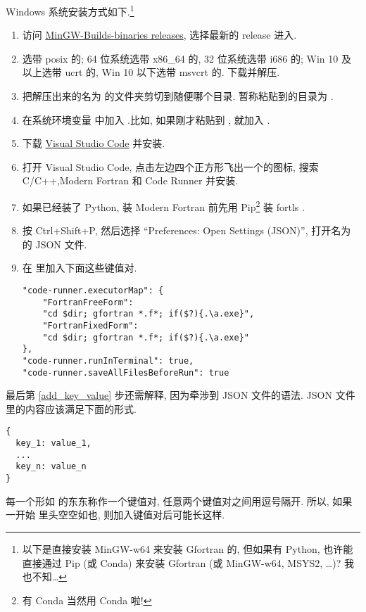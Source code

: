 Windows 系统安装方式如下.\footnote{
    以下是直接安装 MinGW-w64 来安装 Gfortran 的, 但如果有 Python, 也许能直接通过 Pip (或 Conda) 来安装 Gfortran (或 MinGW-w64, MSYS2, \dots{})? 我也不知\dots{}
}
\begin{enumerate}
    \item 访问 \href{https://github.com/niXman/mingw-builds-binaries/releases}
    {MinGW-Builds-binaries releases}, 选择最新的 release 进入.
    \item 选带 posix 的; 64 位系统选带 x86\_{}64 的, 32 位系统选带 i686 的; Win 10 及以上选带 ucrt 的, Win 10 以下选带 msvcrt 的. 下载并解压.
    \item 把解压出来的名为  的文件夹剪切到随便哪个目录. 暂称粘贴到的目录为 \ttt{[dir]}.
    \item 在系统环境变量  中加入 .比如, 如果刚才粘贴到 , 就加入 .
    \item 下载 \href{https://code.visualstudio.com/sha/download?build=stable&os=win32-x64-user}{Visual Studio Code} 并安装.
    \item 打开 Visual Studio Code, 点击左边四个正方形飞出一个的图标, 搜索 C/C++,Modern Fortran 和 Code Runner 并安装.
    \item[] 如果已经装了 Python, 装 Modern Fortran 前先用 Pip\footnote{有 Conda 当然用 Conda 啦!} 装 fortls .
    \item 按 Ctrl+Shift+P, 然后选择 ``Preferences: Open Settings (JSON)'', 打开名为  的 JSON 文件.
    \item 在  里加入下面这些键值对.\label{add_key_value}
    \begin{lstlisting}[numbers=none]
"code-runner.executorMap": {
    "FortranFreeForm":
    "cd $dir; gfortran *.f*; if($?){.\a.exe}",
    "FortranFixedForm":
    "cd $dir; gfortran *.f*; if($?){.\a.exe}"
},
"code-runner.runInTerminal": true,
"code-runner.saveAllFilesBeforeRun": true
    \end{lstlisting}
\end{enumerate}
最后第 \ref{add_key_value} 步还需解释, 因为牵涉到 JSON 文件的语法. JSON 文件里的内容应该满足下面的形式.
\begin{lstlisting}[numbers=none]
{
  key_1: value_1,
  ...
  key_n: value_n
}
\end{lstlisting}
每一个形如  的东东称作一个键值对, 任意两个键值对之间用逗号隔开. 所以, 如果一开始  里头空空如也, 则加入键值对后可能长这样.
